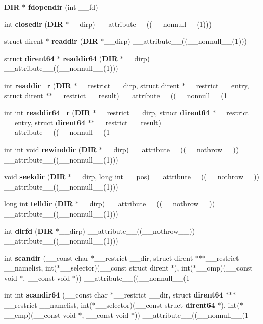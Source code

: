 \begin{DoxyCompactItemize}
\item 
{\bf DIR} $\ast$ {\bf fdopendir} (int \_\-\_\-fd)
\item 
int {\bf closedir} ({\bf DIR} $\ast$\_\-\_\-dirp) \_\-\_\-attribute\_\-\_\-((\_\-\_\-nonnull\_\-\_\-(1)))
\item 
struct dirent $\ast$ {\bf readdir} ({\bf DIR} $\ast$\_\-\_\-dirp) \_\-\_\-attribute\_\-\_\-((\_\-\_\-nonnull\_\-\_\-(1)))
\item 
struct {\bf dirent64} $\ast$ {\bf readdir64} ({\bf DIR} $\ast$\_\-\_\-dirp) \_\-\_\-attribute\_\-\_\-((\_\-\_\-nonnull\_\-\_\-(1)))
\item 
int {\bf readdir\_\-r} ({\bf DIR} $\ast$\_\-\_\-restrict \_\-\_\-dirp, struct dirent $\ast$\_\-\_\-restrict \_\-\_\-entry, struct dirent $\ast$$\ast$\_\-\_\-restrict \_\-\_\-result) \_\-\_\-attribute\_\-\_\-((\_\-\_\-nonnull\_\-\_\-(1
\item 
int int {\bf readdir64\_\-r} ({\bf DIR} $\ast$\_\-\_\-restrict \_\-\_\-dirp, struct {\bf dirent64} $\ast$\_\-\_\-restrict \_\-\_\-entry, struct {\bf dirent64} $\ast$$\ast$\_\-\_\-restrict \_\-\_\-result) \_\-\_\-attribute\_\-\_\-((\_\-\_\-nonnull\_\-\_\-(1
\item 
int int void {\bf rewinddir} ({\bf DIR} $\ast$\_\-\_\-dirp) \_\-\_\-attribute\_\-\_\-((\_\-\_\-nothrow\_\-\_\-)) \_\-\_\-attribute\_\-\_\-((\_\-\_\-nonnull\_\-\_\-(1)))
\item 
void {\bf seekdir} ({\bf DIR} $\ast$\_\-\_\-dirp, long int \_\-\_\-pos) \_\-\_\-attribute\_\-\_\-((\_\-\_\-nothrow\_\-\_\-)) \_\-\_\-attribute\_\-\_\-((\_\-\_\-nonnull\_\-\_\-(1)))
\item 
long int {\bf telldir} ({\bf DIR} $\ast$\_\-\_\-dirp) \_\-\_\-attribute\_\-\_\-((\_\-\_\-nothrow\_\-\_\-)) \_\-\_\-attribute\_\-\_\-((\_\-\_\-nonnull\_\-\_\-(1)))
\item 
int {\bf dirfd} ({\bf DIR} $\ast$\_\-\_\-dirp) \_\-\_\-attribute\_\-\_\-((\_\-\_\-nothrow\_\-\_\-)) \_\-\_\-attribute\_\-\_\-((\_\-\_\-nonnull\_\-\_\-(1)))
\item 
int {\bf scandir} (\_\-\_\-const char $\ast$\_\-\_\-restrict \_\-\_\-dir, struct dirent $\ast$$\ast$$\ast$\_\-\_\-restrict \_\-\_\-namelist, int($\ast$\_\-\_\-selector)(\_\-\_\-const struct dirent $\ast$), int($\ast$\_\-\_\-cmp)(\_\-\_\-const void $\ast$, \_\-\_\-const void $\ast$)) \_\-\_\-attribute\_\-\_\-((\_\-\_\-nonnull\_\-\_\-(1
\item 
int int {\bf scandir64} (\_\-\_\-const char $\ast$\_\-\_\-restrict \_\-\_\-dir, struct {\bf dirent64} $\ast$$\ast$$\ast$\_\-\_\-restrict \_\-\_\-namelist, int($\ast$\_\-\_\-selector)(\_\-\_\-const struct {\bf dirent64} $\ast$), int($\ast$\_\-\_\-cmp)(\_\-\_\-const void $\ast$, \_\-\_\-const void $\ast$)) \_\-\_\-attribute\_\-\_\-((\_\-\_\-nonnull\_\-\_\-(1

\end{DoxyCompactItemize}
